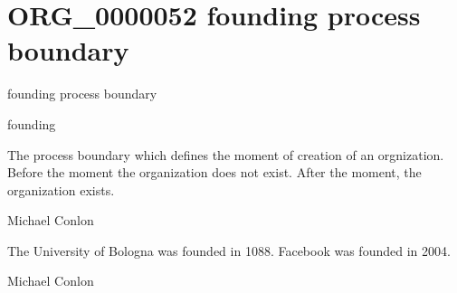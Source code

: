 \documentclass[letterpaper,10pt,english]{sphinxmanual}
\begin{document}
\section{ORG\_0000052 \sphinxhyphen{} founding process boundary}
\label{\detokenize{doc-ORG_0000052:org-0000052-founding-process-boundary}}\label{\detokenize{doc-ORG_0000052:index-0}}\label{\detokenize{doc-ORG_0000052::doc}}
\begin{sphinxShadowBox}

\sphinxAtStartPar
founding process boundary
\end{sphinxShadowBox}

\begin{sphinxShadowBox}

\sphinxAtStartPar
founding
\end{sphinxShadowBox}

\begin{sphinxShadowBox}

\sphinxAtStartPar
The process boundary which defines the moment of creation of an orgnization.  Before the moment  the organization does not exist.  After the moment, the organization exists.
\end{sphinxShadowBox}

\begin{sphinxShadowBox}

\sphinxAtStartPar
Michael Conlon 
\end{sphinxShadowBox}

\begin{sphinxShadowBox}

\sphinxAtStartPar
The University of Bologna was founded in 1088.  Facebook was founded in 2004.
\end{sphinxShadowBox}

\begin{sphinxShadowBox}

\sphinxAtStartPar
Michael Conlon 
\end{sphinxShadowBox}
\begin{quote}
\label{\detokenize{doc-ORG_0000053:org-0000053}}\label{\detokenize{doc-ORG_0000053:dissolution-process}}\label{\detokenize{doc-ORG_0000053:org-0000053}}
\ignorespaces \end{quote}
\end{document}
